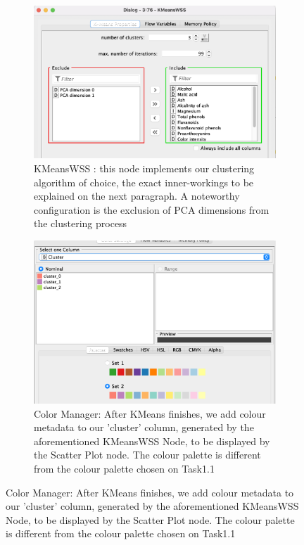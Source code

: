 \documentclass[11pt]{article}
\begin{document}
			\iftrue
			\begin{figure}[H]
				\centering
				\begin{subfigure}{0.4\textwidth}
					\includegraphics[width=\textwidth]{res/t1/t12/t12-kmeans-wss-conf}
					\caption{KMeansWSS : this node implements our clustering algorithm of choice, the exact inner-workings to be explained on the next paragraph. A noteworthy configuration is the exclusion of PCA dimensions from the clustering process}
					\label{fig:first}
				\end{subfigure}
				\hfill
				\begin{subfigure}{0.4\textwidth}
					\includegraphics[width=\textwidth]{res/t1/t12/t12-color-manager-conf}
					\caption{Color Manager: After KMeans finishes, we add colour metadata to our 'cluster' column, generated by the aforementioned KMeansWSS Node, to be displayed by the Scatter Plot node. The colour palette is different from the colour palette chosen on Task1.1}
					\label{fig:second}
				\end{subfigure}
				\hfill
			\end{figure}
\end{document}
